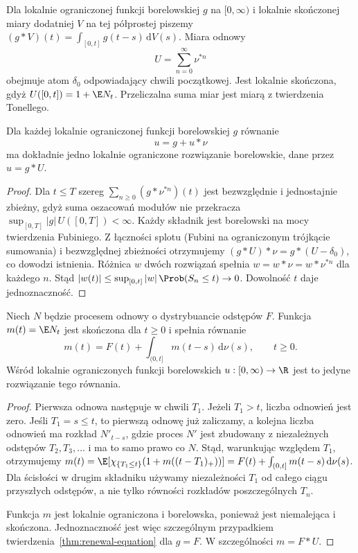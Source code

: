 Dla lokalnie ograniczonej funkcji borelowskiej $g$
na $[0,\infty)$ i lokalnie skończonej miary dodatniej
$V$ na tej półprostej piszemy
$(g*V)(t)=\int_{[0,t]}g(t-s)\,\mathrm dV(s)$.
Miara odnowy
\[
U=\sum_{n=0}^\infty \nu^{*n}
\]
obejmuje atom $\delta_0$ odpowiadający chwili początkowej.
Jest lokalnie skończona, gdyż $U([0,t])=1+\E N_t$.
Przeliczalna suma miar jest miarą z twierdzenia Tonellego.

\begin{twierdzenie}
\label{thm:renewal-equation}
Dla każdej lokalnie ograniczonej funkcji borelowskiej $g$
równanie
\[
u=g+u*\nu
\]
ma dokładnie jedno lokalnie ograniczone rozwiązanie
borelowskie, dane przez $u=g*U$.
\end{twierdzenie}
\begin{proof}
Dla $t\le T$ szereg
$\sum_{n\ge0}(g*\nu^{*n})(t)$ jest bezwzględnie
i jednostajnie zbieżny, gdyż suma oszacowań modułów
nie przekracza
$\sup_{[0,T]}|g|\,U([0,T])<\infty$.
Każdy składnik jest borelowski na mocy twierdzenia
Fubiniego. Z łączności splotu (Fubini na ograniczonym
trójkącie sumowania) i bezwzględnej zbieżności
otrzymujemy $(g*U)*\nu=g*(U-\delta_0)$,
co dowodzi istnienia.
Różnica $w$ dwóch rozwiązań spełnia
$w=w*\nu=w*\nu^{*n}$ dla każdego $n$.
Stąd $|w(t)|\le\sup_{[0,t]}|w|\,\Prob(S_n\le t)\to0$.
Dowolność $t$ daje jednoznaczność.
\end{proof}

\begin{twierdzenie}
Niech $N$ będzie procesem odnowy o dystrybuancie
odstępów $F$. Funkcja $m(t)=\E N_t$ jest skończona
dla $t\ge0$ i spełnia równanie
\[
m(t)=F(t)+\int_{(0,t]}m(t-s)\,\mathrm d\nu(s),\qquad t\ge0.
\]
Wśród lokalnie ograniczonych funkcji borelowskich
$u:[0,\infty)\to\R$ jest to jedyne rozwiązanie tego równania.
\end{twierdzenie}
\begin{proof}
Pierwsza odnowa następuje w chwili $T_1$. Jeżeli $T_1>t$,
liczba odnowień jest zero. Jeśli $T_1=s\le t$,
to pierwszą odnowę już zaliczamy, a kolejna liczba
odnowień ma rozkład $N'_{t-s}$, gdzie proces $N'$ jest
zbudowany z niezależnych odstępów $T_2,T_3,\ldots$
i ma to samo prawo co $N$. Stąd, warunkując względem
$T_1$, otrzymujemy
$m(t)=\E[\chi_{\{T_1\le t\}}(1+m((t-T_1)_+))]
=F(t)+\int_{(0,t]}m(t-s)\,\mathrm d\nu(s)$.
Dla ścisłości w drugim składniku używamy niezależności
$T_1$ od całego ciągu przyszłych odstępów, a nie tylko
równości rozkładów poszczególnych $T_n$.

Funkcja $m$ jest lokalnie ograniczona i borelowska,
ponieważ jest niemalejąca i skończona.
Jednoznaczność jest więc szczególnym przypadkiem
twierdzenia~\ref{thm:renewal-equation} dla $g=F$.
W szczególności $m=F*U$.
\end{proof}

